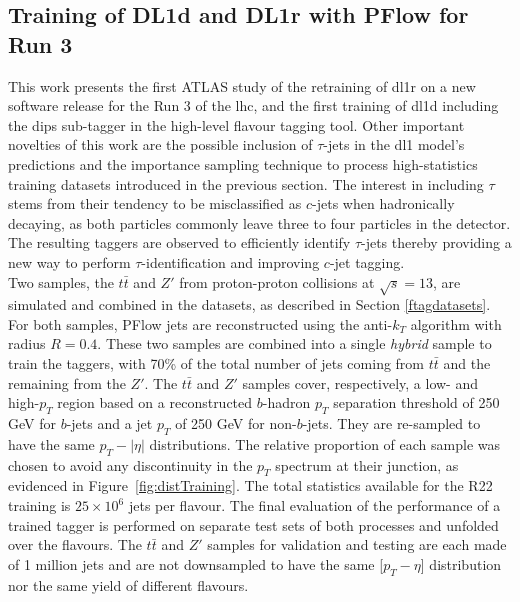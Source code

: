 \subsection{Training of DL1d and DL1r with PFlow for Run 3}
This work presents the first ATLAS study of the retraining of \gls{dl1r} on a new software release for the Run 3 of the \gls{lhc}, and the first training of \gls{dl1d} including the \gls{dips} sub-tagger in the high-level flavour tagging tool. Other important novelties of this work are the possible inclusion of $\tau$-jets in the \gls{dl1} model's predictions and the importance sampling technique to process high-statistics training datasets introduced in the previous section. The interest in including $\tau$ stems from their tendency to be misclassified as $c$-jets when hadronically decaying, as both particles commonly leave three to four particles in the detector. The resulting taggers are observed to efficiently identify $\tau$-jets thereby providing a new way to perform $\tau$-identification and improving $c$-jet tagging.\\ %

Two samples, the $t\bar{t}$ and $Z'$ from proton-proton collisions at $\sqrt{s} = 13$, are simulated and combined in the datasets, as described in Section \ref{ftagdatasets}. For both samples, PFlow jets are reconstructed using the anti-$k_T$ algorithm with radius $R = 0.4$. These two samples are combined into a single \textit{hybrid} sample to train the taggers, with 70\% of the total number of jets coming from $t\bar{t}$ and the remaining from the $Z'$. The $t\bar{t}$ and $Z'$ samples cover, respectively, a low- and high-$p_T$ region based on a reconstructed $b$-hadron $p_T$ separation threshold of 250 GeV for $b$-jets and a jet $p_T$ of 250 GeV for non-$b$-jets. They are re-sampled to have the same $p_T-|\eta|$ distributions. The relative proportion of each sample was chosen to avoid any discontinuity in the $p_T$ spectrum at their junction, as evidenced in Figure~\ref{fig:distTraining}. The total statistics available for the R22 training is $25 \times 10^{6}$ jets per flavour. The final evaluation of the performance of a trained tagger is performed on separate test sets of both processes and unfolded over the flavours. The $t\bar{t}$ and $Z'$ samples for validation and testing are each made of 1 million jets and are not downsampled to have the same [$p_T - \eta$] distribution nor the same yield of different flavours. \\

